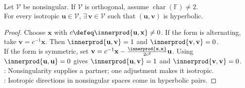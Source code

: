 \begin{theorem} \label{thm:isotropic-vector-sits-in-hyperbolic-plane} \\
Let $\mathcal{V}$ be nonsingular. If $\mathcal{V}$ is orthogonal, assume $\operatorname{char}(\mathbb{F})\neq2$.\\
For every isotropic $\mathbf{u}\in\mathcal{V}$, $\exists\,\mathbf{v}\in\mathcal{V}$ such that $(\mathbf{u},\mathbf{v})$ is hyperbolic.
\begin{proof}
Choose $\mathbf{x}$ with $c\defeq\innerprod{\mathbf{u},\mathbf{x}}\neq0$. If the form is alternating, take $\mathbf{v}=c^{-1}\mathbf{x}$. Then $\innerprod{\mathbf{u},\mathbf{v}}=1$ and $\innerprod{\mathbf{v},\mathbf{v}}=0$.\\
If the form is symmetric, set $\mathbf{v}=c^{-1}\mathbf{x}-\frac{\innerprod{\mathbf{x},\mathbf{x}}}{2c^2}\mathbf{u}$. Using $\innerprod{\mathbf{u},\mathbf{u}}=0$ gives $\innerprod{\mathbf{u},\mathbf{v}}=1$ and $\innerprod{\mathbf{v},\mathbf{v}}=0$.\\
: Nonsingularity supplies a partner; one adjustment makes it isotropic.\\
: Isotropic directions in nonsingular spaces come in hyperbolic pairs.
\end{proof}
\end{theorem}

